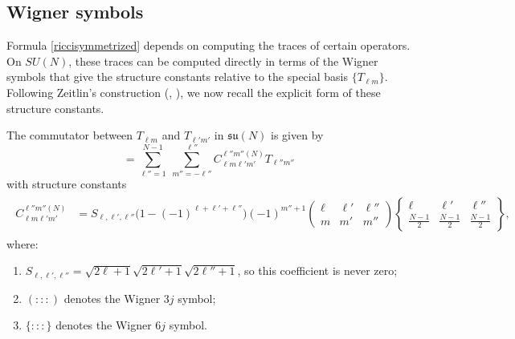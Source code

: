 \documentclass[11pt]{amsart}
\numberwithin{equation}{section}
\theoremstyle{definition}
\begin{document}
\subsection{Wigner symbols}

Formula \eqref{riccisymmetrized} depends on computing the traces of certain operators. On $SU(N)$, these traces can be computed directly in terms of the Wigner symbols that give the structure constants relative to the special basis $\{T_{\ell m}\}$. Following Zeitlin’s construction (\cite{Ze1991}, \cite{Ze2004}), we now recall the explicit form of these structure constants. 




The commutator between $T_{\ell m}$ and $T_{\ell' m'}$ in $\mathfrak{su}(N)$ is given by
\begin{equation}
[T_{\ell m}, T_{\ell' m'}]
=
\sum\limits_{\ell''=1}^{N-1}
~\sum\limits_{m'' = -\ell''}^{\ell''} C_{\ell m\ell' m'}^{\ell'' m''(N)} T_{\ell'' m''}
\end{equation}
with structure constants 
\begin{gather}\label{eq_coefficients}
\begin{split}
C_{\ell m\ell' m'}^{\ell'' m''(N)} &= S_{\ell,\ell',\ell''} \Big(1 - (-1)^{\ell + \ell' + \ell''}\Big)(-1)^{m''+1}
\left(\begin{matrix}
\ell & \ell' & \ell'' \\
m & m' & m''
\end{matrix}
\right)
\left\{\begin{matrix}
\ell & \ell' & \ell'' \\
\frac{N-1}{2} & \frac{N-1}{2} & \frac{N-1}{2}
\end{matrix}
\right\},
\end{split}
\end{gather}
where:
\begin{enumerate}
    \item $S_{\ell,\ell',\ell''} = \sqrt{2\ell+1}\sqrt{2\ell'+1}\sqrt{2\ell''+1}$, so this coefficient is never zero;
    \item $(:::)$ denotes the Wigner $3j$ symbol;
    \item $\{:::\}$ denotes the Wigner $6j$ symbol.
\end{enumerate}
\end{document}
